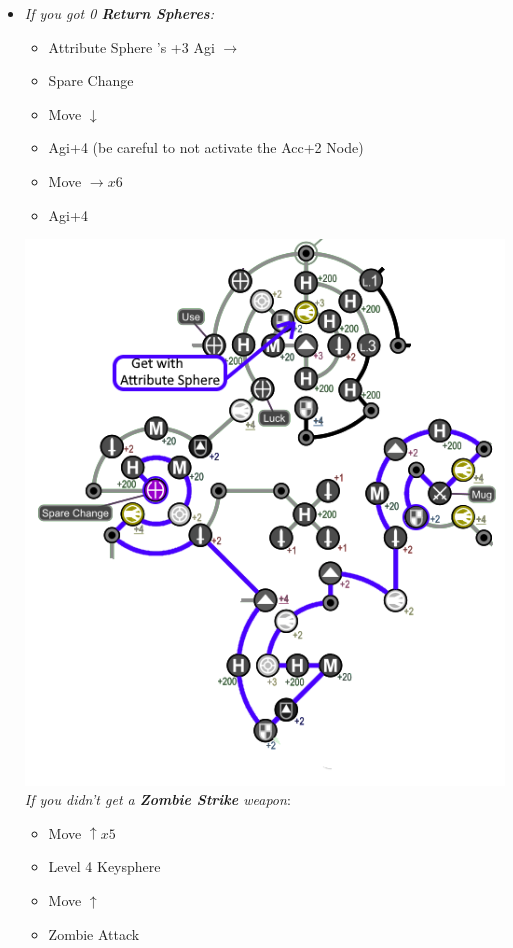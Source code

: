 \begin{spheregrid}
\begin{multicols}{2}
\begin{itemize}
            \item \textit{If you got 0 \textbf{Return Spheres}:}
            \begin{itemize}
                \item Attribute Sphere \rikku's +3 Agi $\rightarrow$
                \item Spare Change
                \item Move $\downarrow$
                \item Agi+4 (be careful to not activate the Acc+2 Node)
                \item Move $\rightarrow x6$
                \item Agi+4
            \end{itemize}
            \includegraphics[width=.8\columnwidth]{graphics/0_return_before_BFA}
            \columnbreak
            \tidusf \textit{If you didn't get a \textbf{Zombie Strike} weapon}:
            \begin{itemize}
                \item Move $\uparrow x5$
                \item Level 4 Keysphere
                \item Move $\uparrow$
                \item Zombie Attack
            \end{itemize}

\end{itemize}
\end{multicols}
\end{spheregrid}
